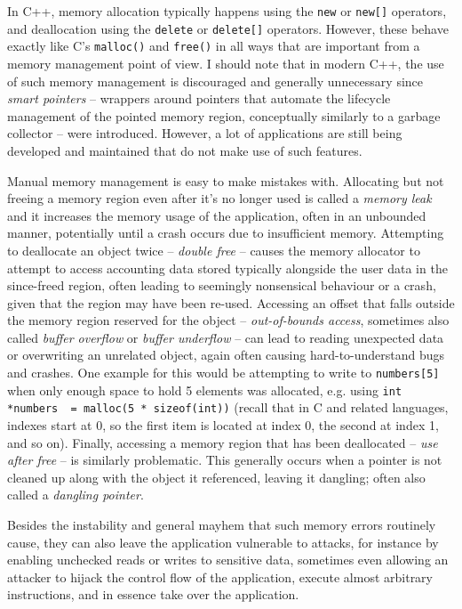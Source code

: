 In C++, memory allocation typically happens using the \lstinline!new! or \lstinline!new[]! operators, and deallocation using the \lstinline!delete! or \lstinline!delete[]! operators. However, these behave exactly like C's \lstinline!malloc()! and \lstinline!free()! in all ways that are important from a memory management point of view. I should note that in modern C++, the use of such memory management is discouraged and generally unnecessary since \emph{smart pointers} -- wrappers around pointers that automate the lifecycle management of the pointed memory region, conceptually similarly to a garbage collector -- were introduced. However, a lot of applications are still being developed and maintained that do not make use of such features.

Manual memory management is easy to make mistakes with. Allocating but not freeing a memory region even after it's no longer used is called a \emph{memory leak} and it increases the memory usage of the application, often in an unbounded manner, potentially until a crash occurs due to insufficient memory. Attempting to deallocate an object twice -- \emph{double free} -- causes the memory allocator to attempt to access accounting data stored typically alongside the user data in the since-freed region, often leading to seemingly nonsensical behaviour or a crash, given that the region may have been re-used. Accessing an offset that falls outside the memory region reserved for the object -- \emph{out-of-bounds access}, sometimes also called \emph{buffer overflow} or \emph{buffer underflow} -- can lead to reading unexpected data or overwriting an unrelated object, again often causing hard-to-understand bugs and crashes. One example for this would be attempting to write to \lstinline!numbers[5]! when only enough space to hold 5 elements was allocated, e.g. using \lstinline!int *numbers  = malloc(5 * sizeof(int))! (recall that in C and related languages, indexes start at 0, so the first item is located at index 0, the second at index 1, and so on). Finally, accessing a memory region that has been deallocated -- \emph{use after free} -- is similarly problematic. This generally occurs when a pointer is not cleaned up along with the object it referenced, leaving it dangling; often also called a \emph{dangling pointer}.

Besides the instability and general mayhem that such memory errors routinely cause, they can also leave the application vulnerable to attacks, for instance by enabling unchecked reads or writes to sensitive data, sometimes even allowing an attacker to hijack the control flow of the application, execute almost arbitrary instructions, and in essence take over the application.

